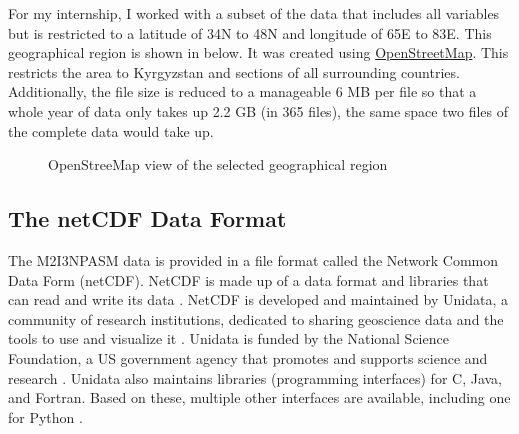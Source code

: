 \documentclass[../00_main.tex]{subfiles}
\begin{document}
For my internship, I worked with a subset of the data that includes all
variables but is restricted to a latitude of 34\textdegree{}N to
48\textdegree{}N and longitude of 65\textdegree{}E to 83\textdegree{}E. This
geographical region is shown in  below. It was created using
\href{https://www.openstreetmap.org/#map=5/43.787/69.565}{OpenStreetMap}. This
restricts the area to Kyrgyzstan and sections of all surrounding countries.
Additionally, the file size is reduced to a manageable 6 MB per file so that
a whole year of data only takes up 2.2 GB (in 365 files), the same space two
files of the complete data would take up.
\begin{figure}[H]
\center
    \caption{OpenStreeMap view of the selected geographical region}
    \label{map}
\end{figure}

\subsection{The netCDF Data Format}

The M2I3NPASM data is provided in a file format called the Network Common Data 
Form (netCDF). NetCDF is made up of a data format and libraries that can read 
and write its data \cite{netcdf}. NetCDF is developed and maintained by 
Unidata, a community of research institutions, dedicated to sharing geoscience 
data and the tools to use and visualize it \cite{unidata}. Unidata is funded by 
the National Science Foundation, a US government agency that promotes and 
supports science and research \cite{nsf}. Unidata also maintains libraries 
(programming interfaces) for C, Java, and Fortran. Based on these, multiple 
other interfaces are available, including one for Python \cite{netcdf-facts}.
\newline
\end{document}
